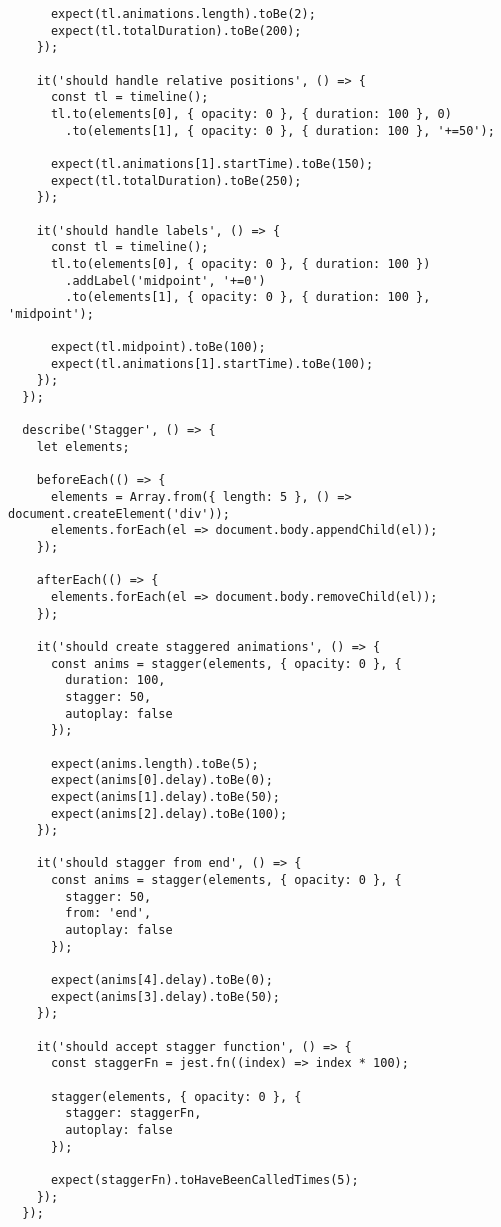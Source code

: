 \documentclass[11pt]{article}
\begin{document}
\begin{verbatim}
      expect(tl.animations.length).toBe(2);
      expect(tl.totalDuration).toBe(200);
    });
    
    it('should handle relative positions', () => {
      const tl = timeline();
      tl.to(elements[0], { opacity: 0 }, { duration: 100 }, 0)
        .to(elements[1], { opacity: 0 }, { duration: 100 }, '+=50');
      
      expect(tl.animations[1].startTime).toBe(150);
      expect(tl.totalDuration).toBe(250);
    });
    
    it('should handle labels', () => {
      const tl = timeline();
      tl.to(elements[0], { opacity: 0 }, { duration: 100 })
        .addLabel('midpoint', '+=0')
        .to(elements[1], { opacity: 0 }, { duration: 100 }, 'midpoint');
      
      expect(tl.midpoint).toBe(100);
      expect(tl.animations[1].startTime).toBe(100);
    });
  });
  
  describe('Stagger', () => {
    let elements;
    
    beforeEach(() => {
      elements = Array.from({ length: 5 }, () => document.createElement('div'));
      elements.forEach(el => document.body.appendChild(el));
    });
    
    afterEach(() => {
      elements.forEach(el => document.body.removeChild(el));
    });
    
    it('should create staggered animations', () => {
      const anims = stagger(elements, { opacity: 0 }, {
        duration: 100,
        stagger: 50,
        autoplay: false
      });
      
      expect(anims.length).toBe(5);
      expect(anims[0].delay).toBe(0);
      expect(anims[1].delay).toBe(50);
      expect(anims[2].delay).toBe(100);
    });
    
    it('should stagger from end', () => {
      const anims = stagger(elements, { opacity: 0 }, {
        stagger: 50,
        from: 'end',
        autoplay: false
      });
      
      expect(anims[4].delay).toBe(0);
      expect(anims[3].delay).toBe(50);
    });
    
    it('should accept stagger function', () => {
      const staggerFn = jest.fn((index) => index * 100);
      
      stagger(elements, { opacity: 0 }, {
        stagger: staggerFn,
        autoplay: false
      });
      
      expect(staggerFn).toHaveBeenCalledTimes(5);
    });
  });
  

\end{verbatim}
\end{document}
